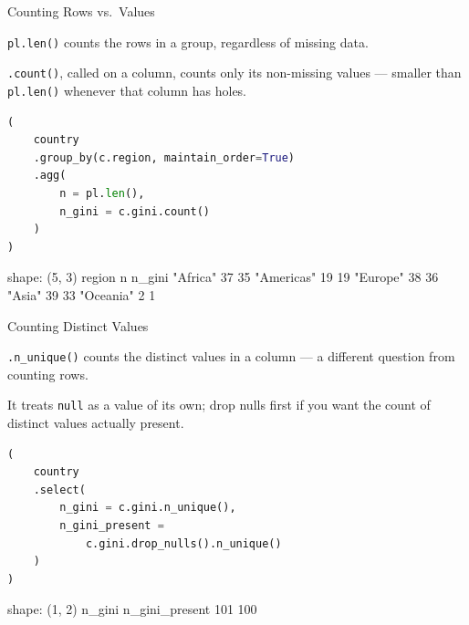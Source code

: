 \documentclass[8pt,aspectratio=169]{beamer}
\begin{document}
\begin{frame}[fragile]{Counting Rows vs.\ Values}
\begin{splitcode}{%

\texttt{pl.len()} counts the rows in a group, regardless of missing data.

\texttt{.count()}, called on a column, counts only its non-missing values --- smaller than \texttt{pl.len()} whenever that column has holes.

}
\begin{lstlisting}[language=Python]
(
    country
    .group_by(c.region, maintain_order=True)
    .agg(
        n = pl.len(),
        n_gini = c.gini.count()
    )
)
\end{lstlisting}
\begin{codeoutput}
shape: (5, 3)
region      n    n_gini
"Africa"    37   35
"Americas"  19   19
"Europe"    38   36
"Asia"      39   33
"Oceania"   2    1
\end{codeoutput}
\end{splitcode}
\end{frame}

\begin{frame}[fragile]{Counting Distinct Values}
\begin{splitcode}{%

\texttt{.n\_unique()} counts the distinct values in a column --- a different question from counting rows.

It treats \texttt{null} as a value of its own; drop nulls first if you want the count of distinct values actually present.

}
\begin{lstlisting}[language=Python]
(
    country
    .select(
        n_gini = c.gini.n_unique(),
        n_gini_present =
            c.gini.drop_nulls().n_unique()
    )
)
\end{lstlisting}
\begin{codeoutput}
shape: (1, 2)
n_gini  n_gini_present
101     100
\end{codeoutput}
\end{splitcode}
\end{frame}
\end{document}
